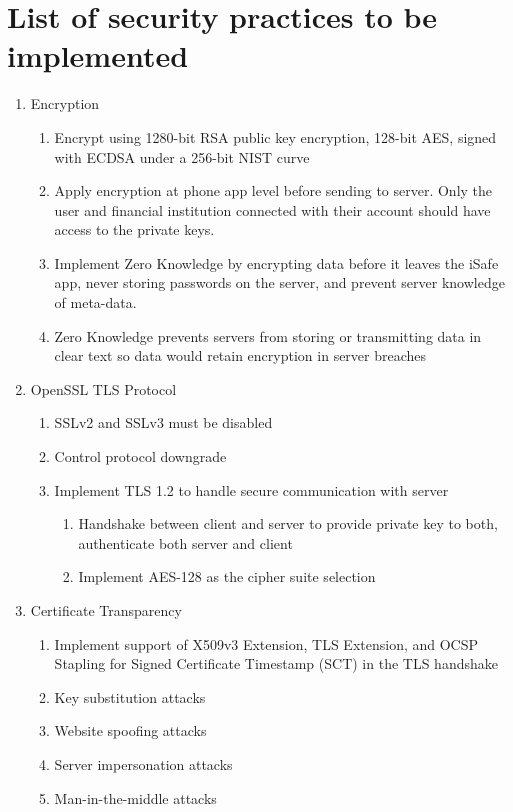 \documentclass[10pt]{article}
\begin{document}
\section*{List of security practices to be implemented}
\begin{enumerate}
\item Encryption
	\begin{enumerate}
	\item Encrypt using 1280-bit RSA public key encryption, 128-bit AES, signed with ECDSA under a 256-bit NIST curve
	\item Apply encryption at phone app level before sending to server.  Only the user and financial institution connected with their account should have access to the private keys.
	\item Implement Zero Knowledge by encrypting data before it leaves the iSafe app, never storing passwords on the server, and prevent server knowledge of meta-data.
	\item Zero Knowledge prevents servers from storing or transmitting data in clear text so data would retain encryption in server breaches
	\end{enumerate}
\item OpenSSL TLS Protocol
	\begin{enumerate}
	\item SSLv2 and SSLv3 must be disabled
	\item Control protocol downgrade
	\item Implement TLS 1.2 to handle secure communication with server
		\begin{enumerate}
			\item Handshake between client and server to provide private key to both, authenticate both server and client
			\item Implement AES-128 as the cipher suite selection
		\end{enumerate}
	\end{enumerate}
\item Certificate Transparency
	\begin{enumerate}
	\item Implement support of X509v3 Extension, TLS Extension, and OCSP Stapling for Signed Certificate Timestamp (SCT) in the TLS handshake
	\item Key substitution attacks
	\item Website spoofing attacks
	\item Server impersonation attacks
	\item Man-in-the-middle attacks
	\end{enumerate}
\end{enumerate}





\end{document}

